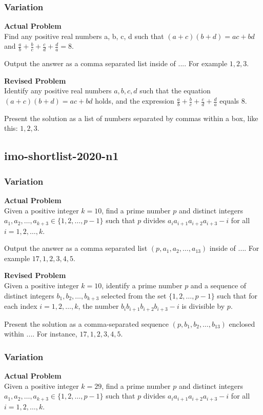 \subsubsection{Variation}
\textbf{Actual Problem}\\
Find any positive real numbers a, b, c, d such that $(a + c)(b + d) = ac + bd$ and $\frac{a}{b} + \frac{b}{c} + \frac{c}{d} + \frac{d}{a} = 8$.

Output the answer as a comma separated list inside of $\boxed{...}$. For example $\boxed{1, 2, 3}$.

\textbf{Revised Problem}\\
Identify any positive real numbers \(a, b, c, d\) such that the equation \((a + c)(b + d) = ac + bd\) holds, and the expression \(\frac{a}{b} + \frac{b}{c} + \frac{c}{d} + \frac{d}{a}\) equals 8.

Present the solution as a list of numbers separated by commas within a box, like this: \(\boxed{1, 2, 3}\).

\subsection{imo-shortlist-2020-n1}
\subsubsection{Variation}
\textbf{Actual Problem}\\
Given a positive integer $k = 10$, find a prime number $p$ and distinct integers $a_1, a_2, \ldots, a_{k+3} \in \{1, 2, \ldots, p-1\}$ such that $p$ divides $a_ia_{i+1}a_{i+2}a_{i+3}-i$ for all $i = 1, 2, \ldots, k$.

Output the answer as a comma separated list $(p, a_1, a_2, \ldots, a_13)$ inside of $\boxed{...}$. For example $\boxed{17, 1, 2, 3, 4, 5}$.

\textbf{Revised Problem}\\
Given a positive integer \( k = 10 \), identify a prime number \( p \) and a sequence of distinct integers \( b_1, b_2, \ldots, b_{k+3} \) selected from the set \(\{1, 2, \ldots, p-1\}\) such that for each index \( i = 1, 2, \ldots, k \), the number \( b_i b_{i+1} b_{i+2} b_{i+3} - i \) is divisible by \( p \).

Present the solution as a comma-separated sequence \( (p, b_1, b_2, \ldots, b_{13}) \) enclosed within \(\boxed{...}\). For instance, \(\boxed{17, 1, 2, 3, 4, 5}\).

\subsubsection{Variation}
\textbf{Actual Problem}\\
Given a positive integer $k = 29$, find a prime number $p$ and distinct integers $a_1, a_2, \ldots, a_{k+3} \in \{1, 2, \ldots, p-1\}$ such that $p$ divides $a_ia_{i+1}a_{i+2}a_{i+3}-i$ for all $i = 1, 2, \ldots, k$.

